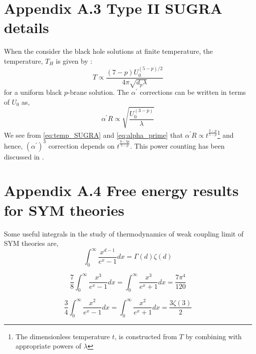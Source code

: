 \section*{\label{app:3sugra} Appendix A.3 Type II SUGRA details}
When the consider the black hole solutions at finite temperature, the temperature, $T_{H}$ is given by : 
\begin{equation}
\label{eq:temp_SUGRA}
T \propto \frac{(7-p) U_{0}^{(5-p)/2}}{4 \pi \sqrt{d_{p} \lambda}}
\end{equation}
for a uniform black $p$-brane solution. The $ \alpha^{\prime}$ corrections can be written in terms of $U_{0}$ as, 
\begin{equation}
  \label{eq:alpha_prime}
\alpha^{\prime} R \propto \sqrt{\frac{U_{0}^{(3-p)}}{\lambda}}
\end{equation}
We see from \ref{eq:temp_SUGRA} and \ref{eq:alpha_prime} that $ \alpha^{\prime} R \propto t^{\frac{3-p}{5-p}}$\footnote{The dimensionless temperature $t$, is constructed 
from $T$ by combining with appropriate powers of $\lambda$} and hence, $ (\alpha^{\prime})^3$ correction depends on $t^{\frac{9-3p}{5-p}}$. This power counting has been discussed in \cite{Berkowitz:2016jlq}.



\section*{\label{app:4energy} Appendix A.4 Free energy results for SYM theories}

Some useful integrals in the study of thermodynamics of weak coupling limit of SYM theories are, 
\begin{equation}
    \int_{0}^{\infty} \frac{x^{d-1}}{e^{x} -1} dx = \Gamma(d)\zeta(d) 
\end{equation}

\begin{equation}
    \frac{7}{8}\int_{0}^{\infty} \frac{x^3}{e^{x} -1} dx = 
    \int_{0}^{\infty} \frac{x^3}{e^{x}+1} dx = \frac{7\pi^4}{120} 
\end{equation}

\begin{equation}
    \frac{3}{4}\int_{0}^{\infty} \frac{x^2}{e^{x} -1} dx = 
    \int_{0}^{\infty} \frac{x^2}{e^{x}+1} dx = \frac{3 \zeta(3)}{2}
\end{equation}

